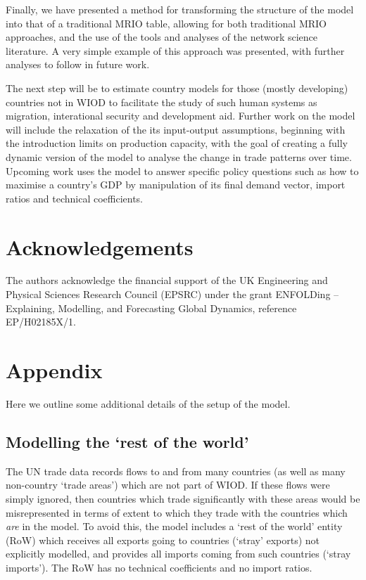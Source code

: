 \documentclass[a4paper]{article}
\begin{document}
Finally, we have presented a method for transforming the structure of the model into that of a traditional MRIO table, allowing for both traditional MRIO approaches, and the use of the tools and analyses of the network science literature.
A very simple example of this approach was presented, with further analyses to follow in future work.

The next step will be to estimate country models for those (mostly developing) countries not in WIOD to facilitate the study of such human systems as migration, interational security and development aid.
Further work on the model will include the relaxation of the its input-output assumptions, beginning with the introduction limits on production capacity, with the goal of creating a fully dynamic version of the model to analyse the change in trade patterns over time.
Upcoming work uses the model to answer specific policy questions such as how to maximise a country's GDP by manipulation of its final demand vector, import ratios and technical coefficients.


\section*{Acknowledgements}

The authors acknowledge the financial support of the UK Engineering and Physical Sciences Research Council (EPSRC) under the grant ENFOLDing -- Explaining, Modelling, and Forecasting Global Dynamics, reference EP/H02185X/1. 



\printbibliography

\appendix
\section{Appendix}
Here we outline some additional details of the setup of the model.

\subsection{Modelling the `rest of the world'}\label{sec:RoW}
The UN trade data records flows to and from many countries (as well as many non-country `trade areas') which are not part of WIOD. If these flows were simply ignored, then countries which trade significantly with these areas would be misrepresented in terms of extent to which they trade with the countries which \textit{are} in the model. To avoid this, the model includes a `rest of the world' entity (RoW) which receives all exports going to countries (`stray' exports) not explicitly modelled, and provides all imports coming from such countries (`stray imports'). The RoW has no technical coefficients and no import ratios.
\end{document}
